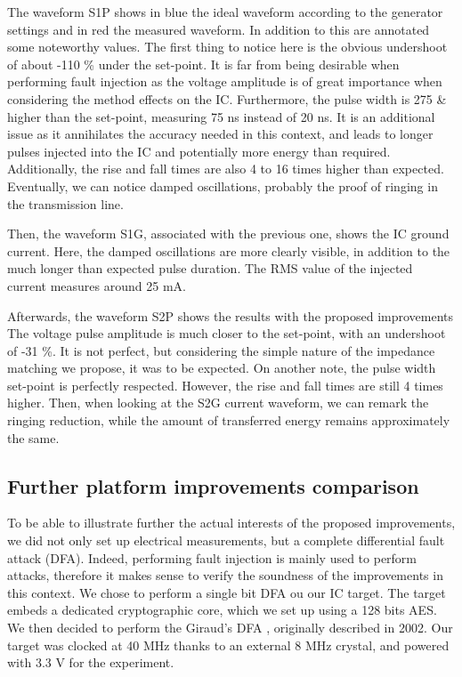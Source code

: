 		The waveform S1P shows in blue the ideal waveform according to the generator settings and in red the measured waveform.
		In addition to this are annotated some noteworthy values.
		The first thing to notice here is the obvious undershoot of about -110 \% under the set-point.
		It is far from being desirable when performing fault injection as the voltage amplitude is of great importance when considering the method effects on the IC.
		Furthermore, the pulse width is 275 \& higher than the set-point, measuring 75 ns instead of 20 ns.
		It is an additional issue as it annihilates the accuracy needed in this context, and leads to longer pulses injected into the IC and potentially more energy than required.
		Additionally, the rise and fall times are also 4 to 16 times higher than expected.
		Eventually, we can notice damped oscillations, probably the proof of ringing in the transmission line.
		
		Then, the waveform S1G, associated with the previous one, shows the IC ground current.
		Here, the damped oscillations are more clearly visible, in addition to the much longer than expected pulse duration.
		The RMS value of the injected current measures around 25 mA.
		
		Afterwards, the waveform S2P shows the results with the proposed improvements
		The voltage pulse amplitude is much closer to the set-point, with an undershoot of -31 \%.
		It is not perfect, but considering the simple nature of the impedance matching we propose, it was to be expected.
		On another note, the pulse width set-point is perfectly respected.
		However, the rise and fall times are still 4 times higher.
		Then, when looking at the S2G current waveform, we can remark the ringing reduction, while the amount of transferred energy remains approximately the same.
		
	\subsection{Further platform improvements comparison}
		To be able to illustrate further the actual interests of the proposed improvements, we did not only set up electrical measurements, but a complete differential fault attack (DFA).
		Indeed, performing fault injection is mainly used to perform attacks, therefore it makes sense to verify the soundness of the improvements in this context.
		We chose to perform a single bit DFA ou our IC target.
		The target embeds a dedicated cryptographic core, which we set up using a 128 bits AES.
		We then decided to perform the Giraud's DFA \cite{giraudDfa}, originally described in 2002.
		Our target was clocked at 40 MHz thanks to an external 8 MHz crystal, and powered with 3.3 V for the experiment.
		
